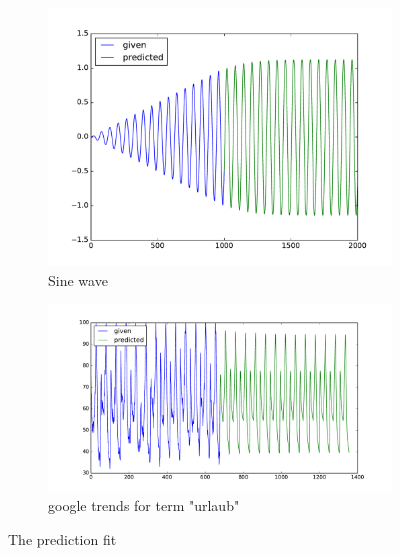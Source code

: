 \documentclass{article}
\begin{document}
\begin{enumerate}
\begin{enumerate}
\begin{item}
		\end{item}
		
		
	\end{enumerate}




		\begin{figure}[t]
			\centering
			\begin{subfigure}[b]{0.45\textwidth}
				\includegraphics[width=1\textwidth]{figures/sine}
				\caption{Sine wave}
				\label{fig:sine}
			\end{subfigure}	
			\quad
			\begin{subfigure}[b]{0.45\textwidth}
				\includegraphics[width=1\textwidth]{figures/urlaub}
				\caption{google trends for term "urlaub"}
				\label{fig:urlaub}
			\end{subfigure}	
			\caption{The prediction fit}
		\end{figure}



\end{enumerate}
\end{document}
